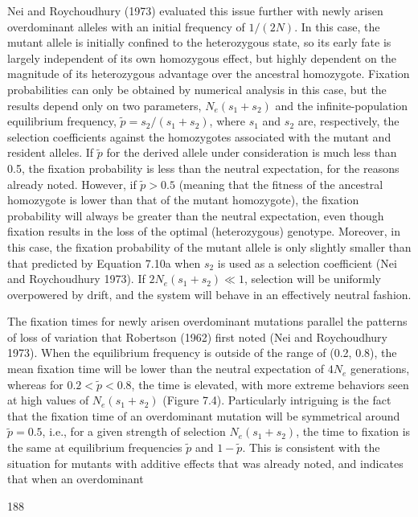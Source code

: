 \documentclass{article}
\begin{document}
Nei and Roychoudhury (1973) evaluated this issue further with newly arisen overdominant alleles with an initial frequency of  $ 1/(2N) $. In this case, the mutant allele is initially confined to the heterozygous state, so its early fate is largely independent of its own homozygous effect, but highly dependent on the magnitude of its heterozygous advantage over the ancestral homozygote. Fixation probabilities can only be obtained by numerical analysis in this case, but the results depend only on two parameters,  $ N_e(s_1 + s_2) $ and the infinite-population equilibrium frequency,  $ \tilde{p} = s_2/(s_1 + s_2) $, where  $ s_1 $ and  $ s_2 $ are, respectively, the selection coefficients against the homozygotes associated with the mutant and resident alleles. If  $ \tilde{p} $ for the derived allele under consideration is much less than 0.5, the fixation probability is less than the neutral expectation, for the reasons already noted. However, if  $ \tilde{p} > 0.5 $ (meaning that the fitness of the ancestral homozygote is lower than that of the mutant homozygote), the fixation probability will always be greater than the neutral expectation, even though fixation results in the loss of the optimal (heterozygous) genotype. Moreover, in this case, the fixation probability of the mutant allele is only slightly smaller than that predicted by Equation 7.10a when  $ s_2 $ is used as a selection coefficient (Nei and Roychoudhury 1973). If  $ 2N_e(s_1 + s_2) \ll 1 $, selection will be uniformly overpowered by drift, and the system will behave in an effectively neutral fashion.

The fixation times for newly arisen overdominant mutations parallel the patterns of loss of variation that Robertson (1962) first noted (Nei and Roychoudhury 1973). When the equilibrium frequency is outside of the range of (0.2, 0.8), the mean fixation time will be lower than the neutral expectation of  $ 4N_e $ generations, whereas for  $ 0.2 < \tilde{p} < 0.8 $, the time is elevated, with more extreme behaviors seen at high values of  $ N_e(s_1 + s_2) $ (Figure 7.4). Particularly intriguing is the fact that the fixation time of an overdominant mutation will be symmetrical around  $ \tilde{p} = 0.5 $, i.e., for a given strength of selection  $ N_e(s_1 + s_2) $, the time to fixation is the same at equilibrium frequencies  $ \tilde{p} $ and  $ 1 - \tilde{p} $. This is consistent with the situation for mutants with additive effects that was already noted, and indicates that when an overdominant

188
\end{document}
